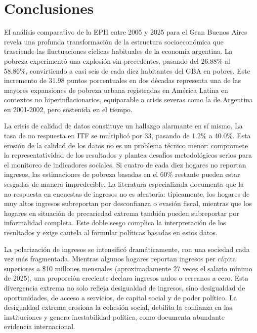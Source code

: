 \documentclass[11pt,a4paper]{article}
\begin{document}
\section{Conclusiones}

El análisis comparativo de la EPH entre 2005 y 2025 para el Gran Buenos Aires revela una profunda transformación de la estructura socioeconómica que trasciende las fluctuaciones cíclicas habituales de la economía argentina. La pobreza experimentó una explosión sin precedentes, pasando del 26.88\% al 58.86\%, convirtiendo a casi seis de cada diez habitantes del GBA en pobres. Este incremento de 31.98 puntos porcentuales en dos décadas representa una de las mayores expansiones de pobreza urbana registradas en América Latina en contextos no hiperinflacionarios, equiparable a crisis severas como la de Argentina en 2001-2002, pero sostenida en el tiempo.

La crisis de calidad de datos constituye un hallazgo alarmante en sí mismo. La tasa de no respuesta en ITF se multiplicó por 33, pasando de 1.2\% a 40.0\%. Esta erosión de la calidad de los datos no es un problema técnico menor: compromete la representatividad de los resultados y plantea desafíos metodológicos serios para el monitoreo de indicadores sociales. Si cuatro de cada diez hogares no reportan ingresos, las estimaciones de pobreza basadas en el 60\% restante pueden estar sesgadas de manera impredecible. La literatura especializada documenta que la no respuesta en encuestas de ingresos no es aleatoria: típicamente, los hogares de muy altos ingresos subreportan por desconfianza o evasión fiscal, mientras que los hogares en situación de precariedad extrema también pueden subreportar por informalidad completa. Este doble sesgo complica la interpretación de los resultados y exige cautela al formular políticas basadas en estos datos.

La polarización de ingresos se intensificó dramáticamente, con una sociedad cada vez más fragmentada. Mientras algunos hogares reportan ingresos per cápita superiores a \$10 millones mensuales (aproximadamente 27 veces el salario mínimo de 2025), una proporción creciente declara ingresos nulos o cercanos a cero. Esta divergencia extrema no solo refleja desigualdad de ingresos, sino desigualdad de oportunidades, de acceso a servicios, de capital social y de poder político. La desigualdad extrema erosiona la cohesión social, debilita la confianza en las instituciones y genera inestabilidad política, como documenta abundante evidencia internacional.
\end{document}
